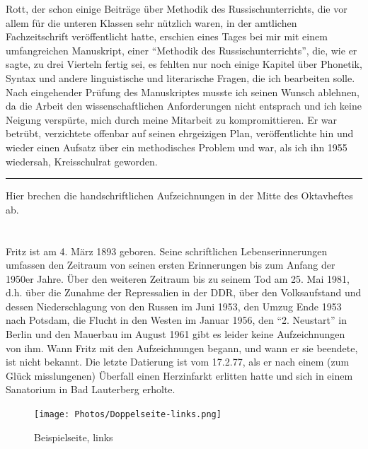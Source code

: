 \documentclass[a5paper,pagesize,10pt,twoside=true]{scrbook}
\begin{document}
Rott, der schon einige Beiträge über Methodik des Russischunterrichts, die vor allem für die unteren Klassen sehr nützlich waren, in der amtlichen Fachzeitschrift veröffentlicht hatte, erschien eines Tages bei mir mit einem umfangreichen Manuskript, einer \enquote{Methodik des Russischunterrichts}, die, wie er sagte, zu drei Vierteln fertig sei, es fehlten nur noch einige Kapitel über Phonetik, Syntax und andere linguistische und literarische Fragen, die ich bearbeiten solle. Nach eingehender Prüfung des Manuskriptes musste ich seinen Wunsch ablehnen, da die Arbeit den wissenschaftlichen Anforderungen nicht entsprach und ich keine Neigung verspürte, mich durch meine Mitarbeit zu kompromittieren. Er war betrübt, verzichtete offenbar auf seinen ehrgeizigen Plan, veröffentlichte hin und wieder einen Aufsatz über ein methodisches Problem und war, als ich ihn 1955 wiedersah, Kreisschulrat geworden.\\

\noindent\rule{12cm}{0.4pt}

\begin{addmargin}[25pt]{30pt}
\noindent Hier brechen die handschriftlichen Aufzeichnungen in der Mitte des Oktavheftes ab.
\end{addmargin}

\mbox{}
\newpage

\chapter*{}

\mbox{}
\newpage


Fritz ist am 4. März 1893 geboren. Seine schriftlichen Lebenserinnerungen umfassen den Zeitraum von seinen ersten Erinnerungen bis zum Anfang der 1950er Jahre. Über den weiteren Zeitraum bis zu seinem Tod am 25. Mai 1981, d.h. über die Zunahme der Repressalien in der DDR, über den Volksaufstand und dessen Niederschlagung von den Russen im Juni 1953, den Umzug Ende 1953 nach Potsdam, die Flucht in den Westen im Januar 1956, den \enquote{2. Neustart} in Berlin und den Mauerbau im August 1961 gibt es leider keine Aufzeichnungen von ihm. Wann Fritz mit den Aufzeichnungen begann, und wann er sie beendete, ist nicht bekannt. Die letzte Datierung ist vom 17.2.77, als er nach einem (zum Glück misslungenen) Überfall einen Herzinfarkt erlitten hatte und sich in einem Sanatorium in Bad Lauterberg erholte.

\begin{figure}[p]
	\texttt{[image: Photos/Doppelseite-links.png]}
	\caption{Beispielseite, links}
	\label{fig:doppelseite_links}
\end{figure}
\end{document}
